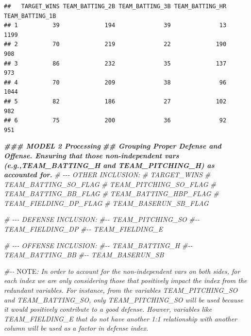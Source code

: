 \documentclass[
]{article}
\newenvironment{Shaded}{\begin{snugshade}}{\end{snugshade}}
\newcommand{\AlertTok}[1]{\textcolor[rgb]{0.94,0.16,0.16}{#1}}
\newcommand{\CommentTok}[1]{\textcolor[rgb]{0.56,0.35,0.01}{\textit{#1}}}
\newcommand{\DocumentationTok}[1]{\textcolor[rgb]{0.56,0.35,0.01}{\textbf{\textit{#1}}}}
\begin{document}
\begin{verbatim}
##   TARGET_WINS TEAM_BATTING_2B TEAM_BATTING_3B TEAM_BATTING_HR TEAM_BATTING_1B
## 1          39             194              39              13            1199
## 2          70             219              22             190             908
## 3          86             232              35             137             973
## 4          70             209              38              96            1044
## 5          82             186              27             102             982
## 6          75             200              36              92             951
\end{verbatim}

\begin{Shaded}
\begin{Highlighting}[]
\DocumentationTok{\#\#\# MODEL 2 Processing}
\DocumentationTok{\#\# Grouping Proper Defense and Offense. Ensuring that those non{-}independent vars (e.g.,TEAM\_BATTING\_H and TEAM\_PITCHING\_H) as accounted for. }
\CommentTok{\# {-}{-}{-} OTHER INCLUSION: }
\CommentTok{\#     TARGET\_WINS}
\CommentTok{\#     TEAM\_BATTING\_SO\_FLAG}
\CommentTok{\#     TEAM\_PITCHING\_SO\_FLAG}
\CommentTok{\#     TEAM\_BATTING\_BB\_FLAG}
\CommentTok{\#     TEAM\_BATTING\_HBP\_FLAG}
\CommentTok{\#     TEAM\_FIELDING\_DP\_FLAG}
\CommentTok{\#     TEAM\_BASERUN\_SB\_FLAG}

\CommentTok{\# {-}{-}{-} DEFENSE INCLUSION: }
      \CommentTok{\#{-}{-} TEAM\_PITCHING\_SO}
      \CommentTok{\#{-}{-} TEAM\_FIELDING\_DP}
      \CommentTok{\#{-}{-} TEAM\_FIELDING\_E}

\CommentTok{\# {-}{-}{-} OFFENSE INCLUSION:  }
      \CommentTok{\#{-}{-} TEAM\_BATTING\_H}
      \CommentTok{\#{-}{-} TEAM\_BATTING\_BB}
      \CommentTok{\#{-}{-} TEAM\_BASERUN\_SB }

\CommentTok{\#{-}{-} }\AlertTok{NOTE}\CommentTok{: In order to account for the non{-}independent vars on both sides, for each index we are only considering those that positively impact the index from the redundant variables. For instance, from the variables TEAM\_PITCHING\_SO and TEAM\_BATTING\_SO, only TEAM\_PITCHING\_SO will be used because it would positively contribute to a good defense. Howver, variables like TEAM\_FIELDING\_E that do not have another 1:1 relationship with another column will be used as a factor in defense index.}


\end{Highlighting}
\end{Shaded}
\end{document}
